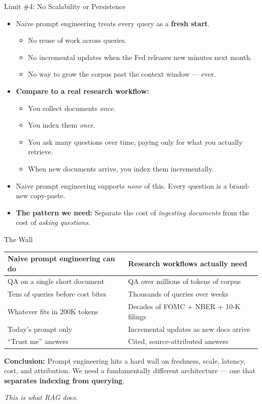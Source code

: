 \documentclass[10pt,english,aspectratio=169]{beamer}
\begin{document}
\begin{frame}{Limit \#4: No Scalability or Persistence}
\begin{itemize}
\item Naive prompt engineering treats every query as a \textbf{fresh start}.
\begin{itemize}
    \item No reuse of work across queries.
    \item No incremental updates when the Fed releases new minutes next month.
    \item No way to grow the corpus past the context window --- ever.
\end{itemize}

\medskip
\item \textbf{Compare to a real research workflow:}
\begin{itemize}
    \item You collect documents \emph{once}.
    \item You index them \emph{once}.
    \item You ask many questions over time, paying only for what you actually retrieve.
    \item When new documents arrive, you index them incrementally.
\end{itemize}

\medskip
\item Naive prompt engineering supports \emph{none} of this. Every question is a brand-new copy-paste.

\medskip
\item \textbf{The pattern we need:} Separate the cost of \emph{ingesting documents} from the cost of \emph{asking questions}.
\end{itemize}
\end{frame}

\begin{frame}{The Wall}
\begin{center}
\renewcommand{\arraystretch}{1.4}
\begin{tabular}{|p{5.5cm}|p{8cm}|}
\hline
\textbf{Naive prompt engineering can do} & \textbf{Research workflows actually need} \\
\hline
QA on a single short document & QA over millions of tokens of corpus \\
\hline
Tens of queries before cost bites & Thousands of queries over weeks \\
\hline
Whatever fits in 200K tokens & Decades of FOMC + NBER + 10-K filings \\
\hline
Today's prompt only & Incremental updates as new docs arrive \\
\hline
``Trust me'' answers & Cited, source-attributed answers \\
\hline
\end{tabular}
\end{center}

\bigskip
\textbf{Conclusion:} Prompt engineering hits a hard wall on freshness, scale, latency, cost, and attribution. We need a fundamentally different architecture --- one that \textbf{separates indexing from querying}.

\bigskip
\centering\emph{This is what RAG does.}
\end{frame}
\end{document}
